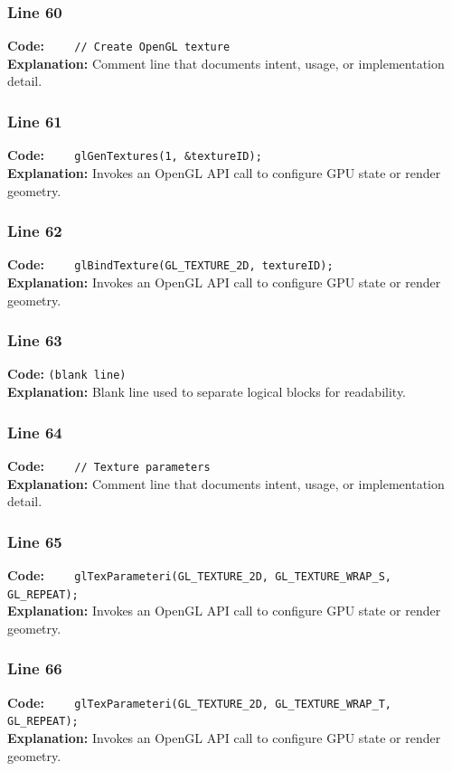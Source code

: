 \documentclass[11pt,a4paper]{article}
\begin{document}
\subsubsection*{Line 60}
\textbf{Code:} \verb|    // Create OpenGL texture|\\
\textbf{Explanation:} Comment line that documents intent, usage, or implementation detail.

\subsubsection*{Line 61}
\textbf{Code:} \verb|    glGenTextures(1, &textureID);|\\
\textbf{Explanation:} Invokes an OpenGL API call to configure GPU state or render geometry.

\subsubsection*{Line 62}
\textbf{Code:} \verb|    glBindTexture(GL_TEXTURE_2D, textureID);|\\
\textbf{Explanation:} Invokes an OpenGL API call to configure GPU state or render geometry.

\subsubsection*{Line 63}
\textbf{Code:} \texttt{(blank line)}\\
\textbf{Explanation:} Blank line used to separate logical blocks for readability.

\subsubsection*{Line 64}
\textbf{Code:} \verb|    // Texture parameters|\\
\textbf{Explanation:} Comment line that documents intent, usage, or implementation detail.

\subsubsection*{Line 65}
\textbf{Code:} \verb|    glTexParameteri(GL_TEXTURE_2D, GL_TEXTURE_WRAP_S, GL_REPEAT);|\\
\textbf{Explanation:} Invokes an OpenGL API call to configure GPU state or render geometry.

\subsubsection*{Line 66}
\textbf{Code:} \verb|    glTexParameteri(GL_TEXTURE_2D, GL_TEXTURE_WRAP_T, GL_REPEAT);|\\
\textbf{Explanation:} Invokes an OpenGL API call to configure GPU state or render geometry.
\end{document}
